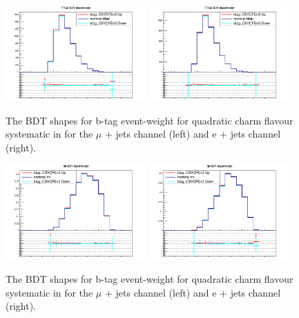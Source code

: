 \begin{figure}[ht!]
    \includegraphics[width=0.48\textwidth]{images/Run2/Sys/btag_CSVCFErr2systt.png}
    \includegraphics[width=0.48\textwidth]{images/Run2/Sys/btag_CSVCFErr2systt_e.png}     
    \caption{The BDT shapes for b-tag event-weight for quadratic charm flavour systematic in \ttbar for the $\mu$ + jets channel (left) and e + jets channel (right).}
    \label{fig:SysShapesCFErrtt2}
\end{figure}
\begin{figure}[ht!]
    \includegraphics[width=0.48\textwidth]{images/Run2/Sys/btag_CSVCFErr2systttt.png}
    \includegraphics[width=0.48\textwidth]{images/Run2/Sys/btag_CSVCFErr2systttt_e.png}     
    \caption{The BDT shapes for b-tag event-weight for quadratic charm flavour systematic in \tttt for the $\mu$ + jets channel (left) and e + jets channel (right).}
    \label{fig:SysShapesCFErrtttt2}
\end{figure}
